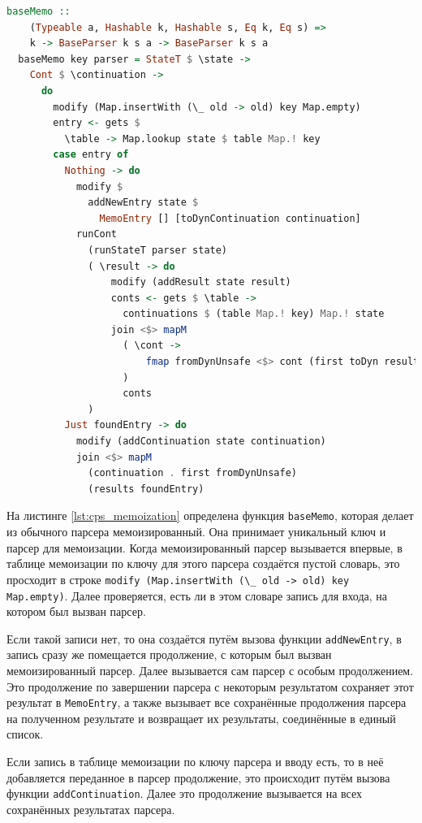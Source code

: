 \documentclass[times]{itmo-student-thesis}
\begin{document}
\begin{lstlisting}[language=Haskell,float=!h,caption={Мемоизация для CPS-парсера},label={lst:cps_memoization}]
  baseMemo ::
    (Typeable a, Hashable k, Hashable s, Eq k, Eq s) =>
    k -> BaseParser k s a -> BaseParser k s a
  baseMemo key parser = StateT $ \state ->
    Cont $ \continuation ->
      do
        modify (Map.insertWith (\_ old -> old) key Map.empty)
        entry <- gets $
          \table -> Map.lookup state $ table Map.! key
        case entry of
          Nothing -> do
            modify $
              addNewEntry state $
                MemoEntry [] [toDynContinuation continuation]
            runCont
              (runStateT parser state)
              ( \result -> do
                  modify (addResult state result)
                  conts <- gets $ \table ->
                    continuations $ (table Map.! key) Map.! state
                  join <$> mapM
                    ( \cont ->
                        fmap fromDynUnsafe <$> cont (first toDyn result)
                    )
                    conts
              )
          Just foundEntry -> do
            modify (addContinuation state continuation)
            join <$> mapM
              (continuation . first fromDynUnsafe)
              (results foundEntry)
\end{lstlisting}

На листинге \ref{lst:cps_memoization} определена функция \lstinline{baseMemo}, которая делает из обычного парсера
мемоизированный. Она принимает уникальный ключ и парсер  для мемоизации. Когда мемоизированный парсер вызывается
впервые, в таблице мемоизации по ключу для этого парсера создаётся пустой словарь, это просходит в строке
\lstinline{modify (Map.insertWith (\_ old -> old) key Map.empty)}. Далее проверяется, есть ли в этом словаре запись для 
входа, на котором был вызван парсер.

Если такой записи нет, то она создаётся путём вызова функции \lstinline{addNewEntry}, в запись сразу же помещается продолжение, с
которым был вызван мемоизированный парсер. Далее вызывается сам парсер с особым продолжением. Это продолжение
по завершении парсера с некоторым результатом сохраняет этот результат в \lstinline{MemoEntry}, а также вызывает все
сохранённые продолжения парсера на полученном результате и возвращает их результаты, соединённые в единый список.

Если запись в таблице мемоизации по ключу парсера и вводу есть, то в неё добавляется переданное в парсер продолжение, это происходит
путём вызова функции \lstinline{addContinuation}. Далее это продолжение вызывается на всех сохранённых результатах парсера.
\end{document}
